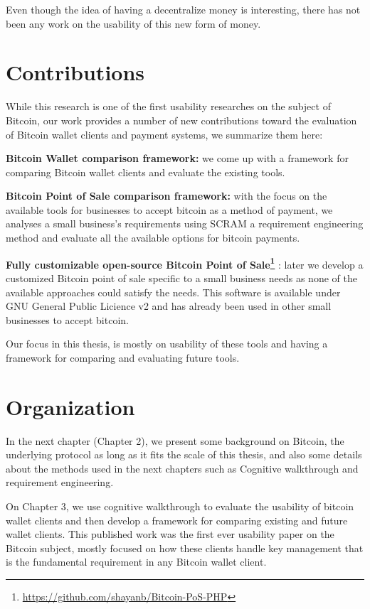 Even though the idea of having a decentralize money is interesting, there has not been any work on the  usability of this new form of money.





\section{Contributions}
While this research is one of the first usability researches on the subject of Bitcoin, our work provides a number of new contributions toward the evaluation of Bitcoin wallet clients and payment systems, we summarize them here:

\textbf{Bitcoin Wallet comparison framework:} we come up with a framework for comparing Bitcoin wallet clients and evaluate the existing tools.

\textbf{Bitcoin Point of Sale comparison framework: } with the focus on the available tools for businesses to accept bitcoin as a method of payment, we analyses a small business's requirements using SCRAM a requirement engineering method and evaluate all the available options for bitcoin payments.

\textbf{Fully customizable open-source Bitcoin Point of Sale\footnote{\url{https://github.com/shayanb/Bitcoin-PoS-PHP}} }: later we develop a customized Bitcoin point of sale specific to a small business needs as none of the available approaches could satisfy the needs. This software is available under GNU General Public Licience v2 and has already been used in other small businesses to accept bitcoin.

Our focus in this thesis, is mostly on usability of these tools and having a framework for comparing and evaluating future tools.

\section{Organization}
In the next chapter (Chapter 2), we present some background on Bitcoin, the underlying protocol as long as it fits the scale of this thesis, and also some details about the methods used in the next chapters such as Cognitive walkthrough and requirement engineering.

On Chapter 3, we use cognitive walkthrough to evaluate the usability of bitcoin wallet clients and then develop a framework for comparing existing and future wallet clients. This published work was the first ever usability paper on the Bitcoin subject, mostly focused on how these clients handle key management that is the fundamental requirement in any Bitcoin wallet client.

